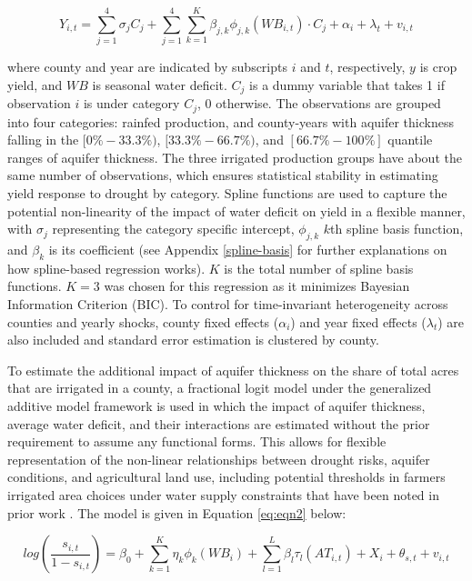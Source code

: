 \documentclass[
]{article}
\begin{document}
\begin{equation}
Y_{i,t} = \sum_{j=1}^4 \sigma_j C_j + \sum_{j=1}^4 \sum_{k=1}^K \beta_{j,k}\phi_{j,k}(WB_{i,t})\cdot C_j  + \alpha_i + \lambda_t + v_{i,t} \label{eq:eqn1}
\end{equation}

where county and year are indicated by subscripts \(i\) and \(t\), respectively, \(y\) is crop yield, and \(WB\) is seasonal water deficit. \(C_j\) is a dummy variable that takes 1 if observation \(i\) is under category \(C_j\), 0 otherwise. The observations are grouped into four categories: rainfed production, and county-years with aquifer thickness falling in the \([0\%-33.3\%)\), \([33.3\%-66.7\%)\), and \([66.7\% - 100\%]\) quantile ranges of aquifer thickness. The three irrigated production groups have about the same number of observations, which ensures statistical stability in estimating yield response to drought by category. Spline functions are used to capture the potential non-linearity of the impact of water deficit on yield in a flexible manner, with \(\sigma_j\) representing the category specific intercept, \(\phi_{j,k}\) \(k\)th spline basis function, and \(\beta_k\) is its coefficient (see Appendix \ref{spline-basis} for further explanations on how spline-based regression works). $K$ is the total number of spline basis functions. $K = 3$ was chosen for this regression as it minimizes Bayesian Information Criterion (BIC). To control for time-invariant heterogeneity across counties and yearly shocks, county fixed effects (\(\alpha_i\)) and year fixed effects (\(\lambda_t\)) are also included and standard error estimation is clustered by county.

To estimate the additional impact of aquifer thickness on the share of total acres that are irrigated in a county, a fractional logit model under the generalized additive model framework is used in which the impact of aquifer thickness, average water deficit, and their interactions are estimated without the prior requirement to assume any functional forms. This allows for flexible representation of the non-linear relationships between drought risks, aquifer conditions, and agricultural land use, including potential thresholds in farmers irrigated area choices under water supply constraints that have been noted in prior work \citep{foster2015well, foster2015analysis, hrozencik2017heterogeneous}. The model is given in Equation \eqref{eq:eqn2} below:

\begin{equation}
    log(\frac{s_{i,t}}{1-s_{i,t}}) = \beta_0 + \sum_{k=1}^K \eta_{k}\phi_{k}(WB_{i}) + \sum_{l=1}^L \beta_{l}\tau_{l}(AT_{i,t}) + X_i + \theta_{s,t} + v_{i,t} \label{eq:eqn2}
\end{equation}
\end{document}
